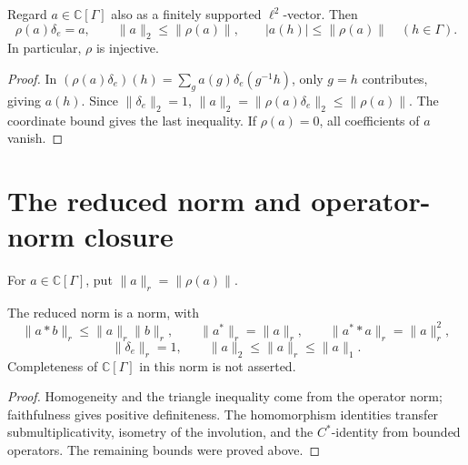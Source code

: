 \begin{proposition}\label{prop:integrated-faithful}
\leanok
{}
Regard $a\in\mathbb C[\Gamma]$ also as a finitely supported $\ell^2$-vector.
Then
\[
 \rho(a)\delta_e=a,\qquad
 \|a\|_2\leq\|\rho(a)\|,\qquad
 |a(h)|\leq\|\rho(a)\|\quad(h\in\Gamma).
\]
In particular, $\rho$ is injective.
\end{proposition}
\begin{proof}
\leanok
In $(\rho(a)\delta_e)(h)=\sum_g a(g)\delta_e(g^{-1}h)$, only $g=h$
contributes, giving $a(h)$. Since $\|\delta_e\|_2=1$,
$\|a\|_2=\|\rho(a)\delta_e\|_2\leq\|\rho(a)\|$.
The coordinate bound gives the last inequality.
If $\rho(a)=0$, all coefficients of $a$ vanish.
\end{proof}

\section{The reduced norm and operator-norm closure}

\begin{definition}\label{def:reduced-norm}
\leanok
{}
For $a\in\mathbb C[\Gamma]$, put $\|a\|_r=\|\rho(a)\|$.
\end{definition}

\begin{proposition}\label{prop:reduced-norm-laws}
\leanok
{}
The reduced norm is a norm, with
\[
 \|a*b\|_r\leq\|a\|_r\|b\|_r,\qquad
 \|a^*\|_r=\|a\|_r,\qquad \|a^**a\|_r=\|a\|_r^2,
\]
\[
 \|\delta_e\|_r=1,\qquad \|a\|_2\leq\|a\|_r\leq\|a\|_1.
\]
Completeness of $\mathbb C[\Gamma]$ in this norm is not asserted.
\end{proposition}
\begin{proof}
\leanok
Homogeneity and the triangle inequality come from the operator norm;
faithfulness gives positive definiteness. The homomorphism identities
transfer submultiplicativity, isometry of the involution, and the
$C^*$-identity from bounded operators. The remaining bounds were proved above.
\end{proof}

